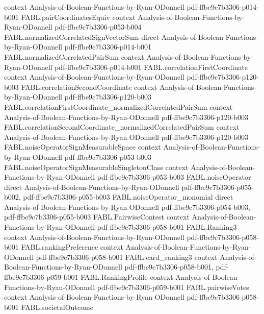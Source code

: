 \begin{theorem}
  {context}
  {Analysis-of-Boolean-Functions-by-Ryan-ODonnell}
  {pdf-ffbe9c7b3306-p014-b001}
\proofstep
  {FABL.pairCoordinatesEquiv}
  {context}
  {Analysis-of-Boolean-Functions-by-Ryan-ODonnell}
  {pdf-ffbe9c7b3306-p053-b004}
\proofstep
  {FABL.normalizedCorrelatedSignVectorSum}
  {direct}
  {Analysis-of-Boolean-Functions-by-Ryan-ODonnell}
  {pdf-ffbe9c7b3306-p014-b001}
\proofstep
  {FABL.normalizedCorrelatedPairSum}
  {context}
  {Analysis-of-Boolean-Functions-by-Ryan-ODonnell}
  {pdf-ffbe9c7b3306-p014-b001}
\proofstep
  {FABL.correlationFirstCoordinate}
  {context}
  {Analysis-of-Boolean-Functions-by-Ryan-ODonnell}
  {pdf-ffbe9c7b3306-p120-b003}
\proofstep
  {FABL.correlationSecondCoordinate}
  {context}
  {Analysis-of-Boolean-Functions-by-Ryan-ODonnell}
  {pdf-ffbe9c7b3306-p120-b003}
\proofstep
  {FABL.correlationFirstCoordinate_normalizedCorrelatedPairSum}
  {context}
  {Analysis-of-Boolean-Functions-by-Ryan-ODonnell}
  {pdf-ffbe9c7b3306-p120-b003}
\proofstep
  {FABL.correlationSecondCoordinate_normalizedCorrelatedPairSum}
  {context}
  {Analysis-of-Boolean-Functions-by-Ryan-ODonnell}
  {pdf-ffbe9c7b3306-p120-b003}
\proofstep
  {FABL.noiseOperatorSignMeasurableSpace}
  {context}
  {Analysis-of-Boolean-Functions-by-Ryan-ODonnell}
  {pdf-ffbe9c7b3306-p053-b003}
\proofstep
  {FABL.noiseOperatorSignMeasurableSingletonClass}
  {context}
  {Analysis-of-Boolean-Functions-by-Ryan-ODonnell}
  {pdf-ffbe9c7b3306-p053-b003}
\proofstep
  {FABL.noiseOperator}
  {direct}
  {Analysis-of-Boolean-Functions-by-Ryan-ODonnell}
  {pdf-ffbe9c7b3306-p055-b002,
    pdf-ffbe9c7b3306-p055-b003}
\proofstep
  {FABL.noiseOperator_monomial}
  {direct}
  {Analysis-of-Boolean-Functions-by-Ryan-ODonnell}
  {pdf-ffbe9c7b3306-p054-b003,
    pdf-ffbe9c7b3306-p055-b003}
\proofstep
  {FABL.PairwiseContest}
  {context}
  {Analysis-of-Boolean-Functions-by-Ryan-ODonnell}
  {pdf-ffbe9c7b3306-p058-b001}
\proofstep
  {FABL.Ranking3}
  {context}
  {Analysis-of-Boolean-Functions-by-Ryan-ODonnell}
  {pdf-ffbe9c7b3306-p058-b001}
\proofstep
  {FABL.rankingPreference}
  {context}
  {Analysis-of-Boolean-Functions-by-Ryan-ODonnell}
  {pdf-ffbe9c7b3306-p058-b001}
\proofstep
  {FABL.card_ranking3}
  {context}
  {Analysis-of-Boolean-Functions-by-Ryan-ODonnell}
  {pdf-ffbe9c7b3306-p058-b001,
    pdf-ffbe9c7b3306-p059-b001}
\proofstep
  {FABL.RankingProfile}
  {context}
  {Analysis-of-Boolean-Functions-by-Ryan-ODonnell}
  {pdf-ffbe9c7b3306-p059-b001}
\proofstep
  {FABL.pairwiseVotes}
  {context}
  {Analysis-of-Boolean-Functions-by-Ryan-ODonnell}
  {pdf-ffbe9c7b3306-p058-b001}
\proofstep
  {FABL.societalOutcome}

\end{theorem}
